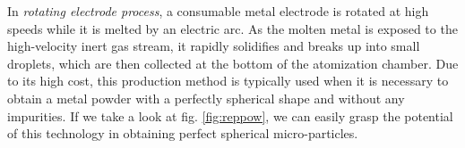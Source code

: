 In \emph{rotating electrode process}, a consumable metal electrode is rotated at high speeds while it is melted by an electric arc. As the molten metal is exposed to the high-velocity inert gas stream, it rapidly solidifies and breaks up into small droplets, which are then collected at the bottom of the atomization chamber. Due to its high cost, this production method is typically used when it is necessary to obtain a metal powder with a perfectly spherical shape and without any impurities. If we take a look at fig. \ref{fig:reppow}, we can easily grasp the potential of this technology in obtaining perfect spherical micro-particles.
\begin{figure}[H]
    \centering
    \qquad
    \qquad

\end{figure}

